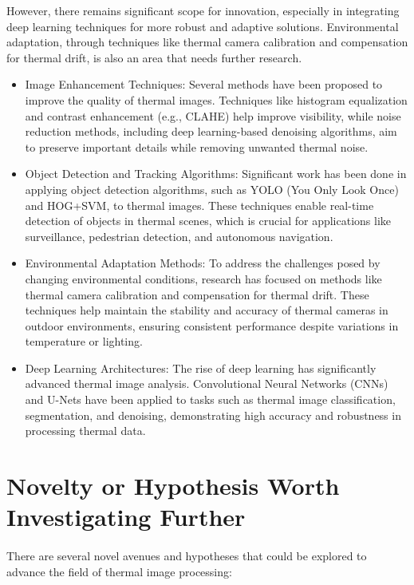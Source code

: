 \documentclass[11pt,a4paper]{report}
\begin{document}
However, there remains significant scope for innovation, especially in integrating deep learning techniques for more robust and adaptive solutions. Environmental adaptation, through techniques like thermal camera calibration and compensation for thermal drift, is also an area that needs further research.

\begin{itemize}       
    \item Image Enhancement Techniques: Several methods have been proposed to improve the quality of thermal images. Techniques like histogram equalization and contrast enhancement (e.g., CLAHE) help improve visibility, while noise reduction methods, including deep learning-based denoising algorithms, aim to preserve important details while removing unwanted thermal noise.

    \item Object Detection and Tracking Algorithms: Significant work has been done in applying object detection algorithms, such as YOLO (You Only Look Once) and HOG+SVM, to thermal images. These techniques enable real-time detection of objects in thermal scenes, which is crucial for applications like surveillance, pedestrian detection, and autonomous navigation.

    \item Environmental Adaptation Methods: To address the challenges posed by changing environmental conditions, research has focused on methods like thermal camera calibration and compensation for thermal drift. These techniques help maintain the stability and accuracy of thermal cameras in outdoor environments, ensuring consistent performance despite variations in temperature or lighting.

    \item Deep Learning Architectures: The rise of deep learning has significantly advanced thermal image analysis. Convolutional Neural Networks (CNNs) and U-Nets have been applied to tasks such as thermal image classification, segmentation, and denoising, demonstrating high accuracy and robustness in processing thermal data.
\end{itemize}

\section{Novelty or Hypothesis Worth Investigating Further}

\paragraph{ } There are several novel avenues and hypotheses that could be explored to advance the field of thermal image processing:
\end{document}
